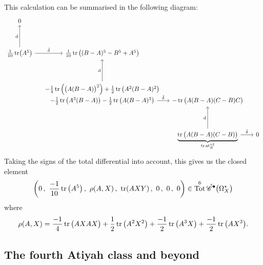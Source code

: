 \documentclass[11pt,fleqn]{article}
\theoremstyle{plain}
\theoremstyle{definition}
\theoremstyle{remark}
\numberwithin{equation}{theorem}
\newcommand{\anotherbullet}{\star}
\newcommand{\cech}{\check{\mathscr{C}}}
\newcommand{\at}{\mathrm{at}}
\newcommand{\expat}[1]{\at^{\circ#1}}
\DeclareMathOperator{\Tot}{Tot}
\begin{document}
        This calculation can be summarised in the following diagram:
        \begin{equation}
            \begin{tikzcd}[row sep=huge,column sep=small]
                0\\
                \frac{1}{10}\tr(A^5)
                    \ar{u}{\mathrm{d}} 
                    \ar{r}{\check\delta}
                & 
                \frac{1}{10}\tr\big((B-A)^5 - B^5 + A^5\big)\\
                & -\frac14\tr\Big(\big(A(B-A)\big)^2\Big) + \frac12 \tr\big(A^2(B-A)^2\big)
                    \ar{u}{\mathrm{d}}
                &\\[-4em]
                & - \frac12\tr\big(A^3(B-A)\big) - \frac12\tr\big(A(B-A)^3\big)
                    \ar{r}{\check\delta}
                & -\tr\big(A(B-A)(C-B)C\big) \\
                && \underbrace{\tr\big(A(B-A)(C-B)\big)}_{\tr\expat{3}_E}
                    \ar{u}{\mathrm{d}}
                    \ar{r}{\check\delta}
                & 0
            \end{tikzcd}
        \end{equation}
        Taking the signs of the total differential into account, this gives us the closed element
        \begin{equation*}
            \left(
                0\,,\,\,
                \frac{-1}{10}\tr\big(A^5\big)\,,\,\,
                \rho(A,X)\,,\,\,
                \tr(AXY)\,,\,\,
                0\,,\,\,
                0\,,\,\,
                0
            \right)\in\Tot^6\cech^\bullet\big(\Omega_X^\anotherbullet\big)
        \end{equation*}
        where
        \begin{equation*}
            \rho(A,X) = \frac{-1}{4}\tr\big(AXAX\big) + \frac12 \tr\big(A^2X^2\big) + \frac{-1}{2}\tr\big(A^3X\big) + \frac{-1}{2}\tr\big(AX^3\big).
        \end{equation*}


    \subsection{The fourth Atiyah class and beyond}
\end{document}
